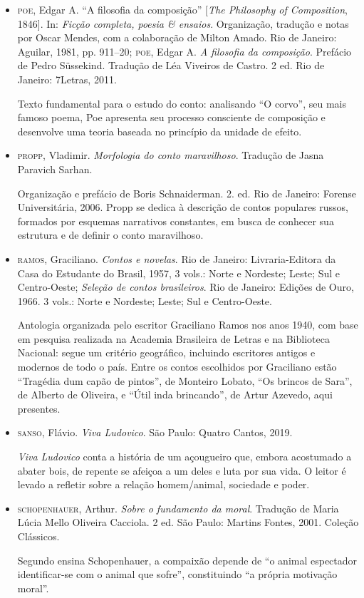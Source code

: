 \begin{itemize}
\item \textsc{poe}, Edgar A. ``A filosofia da composição'' {[}\emph{The Philosophy of
Composition}, 1846{]}. In: \emph{Ficção completa, poesia \& ensaios}.
Organização, tradução e notas por Oscar Mendes, com a colaboração de
Milton Amado. Rio de Janeiro: Aguilar, 1981, pp. 911--20; \textsc{poe}, Edgar A.
\emph{A filosofia da composição}. Prefácio de Pedro Süssekind. Tradução
de Léa Viveiros de Castro. 2 ed. Rio de Janeiro: 7Letras, 2011.

Texto fundamental para o estudo do conto: analisando ``O corvo'', seu mais
famoso poema, Poe apresenta seu processo consciente de composição e
desenvolve uma teoria baseada no princípio da unidade de efeito.

\item \textsc{propp}, Vladimir. \emph{Morfologia do conto maravilhoso}. Tradução de
Jasna Paravich Sarhan.

Organização e prefácio de Boris Schnaiderman. 2.
ed. Rio de Janeiro: Forense Universitária, 2006. Propp se dedica à
descrição de contos populares russos, formados por esquemas narrativos
constantes, em busca de conhecer sua estrutura e de definir o conto
maravilhoso.

\item \textsc{ramos}, Graciliano. \emph{Contos e novelas}. Rio de Janeiro:
Livraria-Editora da Casa do Estudante do Brasil, 1957, 3 vols.: Norte e
Nordeste; Leste; Sul e Centro-Oeste; \emph{Seleção de contos
brasileiros}. Rio de Janeiro: Edições de Ouro, 1966. 3 vols.: Norte e
Nordeste; Leste; Sul e Centro-Oeste.

Antologia organizada pelo escritor
Graciliano Ramos nos anos 1940, com base em pesquisa realizada na
Academia Brasileira de Letras e na Biblioteca Nacional: segue um
critério geográfico, incluindo escritores antigos e modernos de todo o
país. Entre os contos escolhidos por Graciliano estão ``Tragédia dum
capão de pintos'', de Monteiro Lobato, ``Os brincos de Sara'', de
Alberto de Oliveira, e ``Útil inda brincando'', de Artur Azevedo, aqui
presentes.

\item \textsc{sanso}, Flávio. \emph{Viva Ludovico}. São Paulo: Quatro Cantos, 2019.

\emph{Viva Ludovico} conta a história de um açougueiro que, embora
acostumado a abater bois, de repente se afeiçoa a um deles e luta por
sua vida. O leitor é levado a refletir sobre a relação homem/animal,
sociedade e poder.

\item \textsc{schopenhauer}, Arthur. \emph{Sobre o fundamento da moral}. Tradução de
Maria Lúcia Mello Oliveira Cacciola. 2 ed. São Paulo: Martins Fontes,
2001. Coleção Clássicos.

Segundo ensina Schopenhauer, a compaixão
depende de ``o animal espectador identificar-se com o animal que
sofre'', constituindo ``a própria motivação moral''.
\end{itemize}
